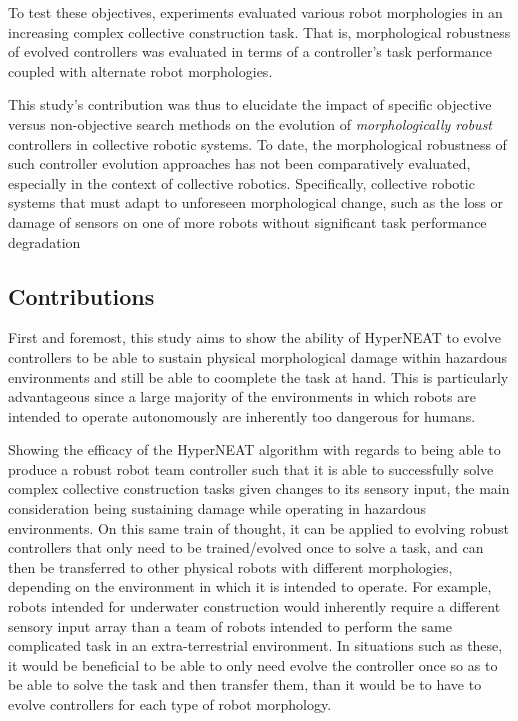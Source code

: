 To test these objectives, experiments evaluated various robot morphologies in an increasing complex collective construction task. 
That is, morphological robustness of evolved controllers was evaluated in terms of a controller's task performance coupled with alternate robot morphologies.

This study's contribution was thus to elucidate the impact of specific objective versus non-objective search methods on the evolution of \textit{morphologically robust} controllers in collective robotic systems. 
To date, the morphological robustness of such controller evolution approaches has not been comparatively evaluated, especially in the context of collective robotics. 
Specifically, collective robotic systems that must adapt to unforeseen morphological change, such as the loss or damage of sensors on one of more robots without significant task performance degradation \cite{BongardZykovLipson2006} \cite{CullyCluneTaraporeMouret2015}


\subsection{Contributions}

First and foremost, this study aims to show the ability of HyperNEAT to evolve controllers to be able to sustain physical morphological damage within hazardous environments and still be able to coomplete the task at hand. This is particularly advantageous since a large majority of the environments in which robots are intended to operate autonomously are inherently too dangerous for humans.

Showing the efficacy of the HyperNEAT algorithm with regards to being able to produce a robust robot team controller such that it is able to successfully solve complex collective construction tasks given changes to its sensory input, the main consideration being sustaining damage while operating in hazardous environments. On this same train of thought, it can be applied to evolving robust controllers that only need to be trained/evolved once to solve a task, and can then be transferred to other physical robots with different morphologies, depending on the environment in which it is intended to operate. For example, robots intended for underwater construction would inherently require a different sensory input array than a team of robots intended to perform the same complicated task in an extra-terrestrial environment. In situations such as these, it would be beneficial to be able to only need evolve the controller once so as to be able to solve the task and then transfer them, than it would be to have to evolve controllers for each type of robot morphology.


